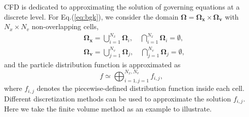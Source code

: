 \documentclass[preprint,3p,12pt,sort&compress]{elsarticle}
\begin{document}
CFD is dedicated to approximating the solution of governing equations at a discrete level.
For Eq.(\ref{eq:bgk}), we consider the domain $\mathbf \Omega=\mathbf \Omega_{\mathbf x} \times \mathbf \Omega_{\mathbf v}$ with $N_{x}\times N_{v}$ non-overlapping cells,
\begin{equation}
\begin{aligned}
    &\mathbf{\Omega}_{\mathbf x} = \bigcup_{i=1}^{N_{x}} \mathbf \Omega_{i}, \quad \bigcap_{i=1}^{N_{x}} \mathbf \Omega_{i} = \emptyset, \\
    &\mathbf{\Omega}_{\mathbf v} = \bigcup_{j=1}^{N_{v}} \mathbf \Omega_{j}, \quad \bigcap_{j=1}^{N_{v}} \mathbf \Omega_{j} = \emptyset,
\end{aligned}
\end{equation}
and the particle distribution function is approximated as
\begin{equation}
    f \simeq \bigoplus_{i=1,j=1}^{N_{x},N_{v}} f_{i,j},
\end{equation}
where $f_{i,j}$ denotes the piecewise-defined distribution function inside each cell.
Different discretization methods can be used to approximate the solution $f_{i,j}$.
Here we take the finite volume method as an example to illustrate.
\end{document}
